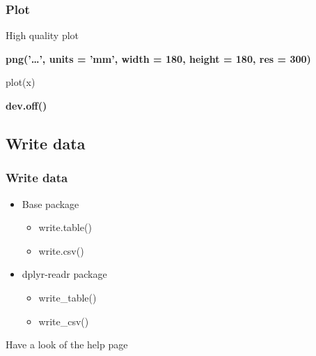 \documentclass{beamer}
\begin{document}
\begin{frame}[fragile]
	\frametitle{Plot}
	\centering \Large High quality plot
	\vspace{30pt}
	\normalsize
	\begin{flushleft}
		\textbf{png('\ldots', units = 'mm', width = 180, height = 180, res = 300)}

	plot(x)

	\textbf{dev.off()}
	\end{flushleft}
\end{frame}


\subsection{Write data}
\begin{frame}[fragile]
	\frametitle{Write data}
	\centering \Large
	\begin{itemize}
		\small
		\item Base package
			\begin{itemize}
				\item write.table()
				\item write.csv()
			\end{itemize}
		\item dplyr-readr package
			\begin{itemize}
				\item write\_table()
				\item write\_csv()
			\end{itemize}
	\end{itemize}
	\vspace{20pt}
	\pause
	\begin{center} \Large Have a look of the help page \end{center}
\end{frame}
\end{document}
